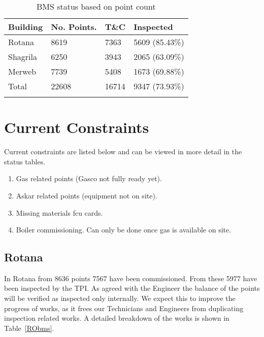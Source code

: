 \begin{table}[htbp]
\begin{tabular}{llll}
\toprule
Building      &No. Points. &T\&C     &Inspected\\
\midrule
Rotana       & 8619        &7363      & 5609 (85.43\%) \\
Shagrila     & 6250        &3943      & 2065 (63.09\%) \\
Merweb     & 7739        &5408       & 1673 (69.88\%) \\
\midrule
Total          &22608       &16714     &9347  (73.93\%) \\
\bottomrule 
\caption{BMS status based on point count}
\label{tbl:bmsstatus}
\end{tabular}
\end{table}

\section{Current Constraints} 

Current constraints are listed below and can be viewed in more detail
in the status tables.

\begin{enumerate}
\item Gas related points (Gasco not fully ready yet).
\item Askar related points (equipment not on site).
\item Missing materials fcu cards.
\item Boiler commissioning. Can only be done once gas is available on
      site.
\end{enumerate}

\subsection{Rotana}
In Rotana from 8636 points 7567 have been commissioned. From these 5977 have been inspected by the TPI. As agreed with the Engineer the balance of the points will be verified as inspected only internally. We expect this to improve the progress of works, as it frees our Technicians and Engineers from duplicating inspection related works. A detailed breakdown of the works is shown in Table~\ref{RObms}. 
\bigskip



